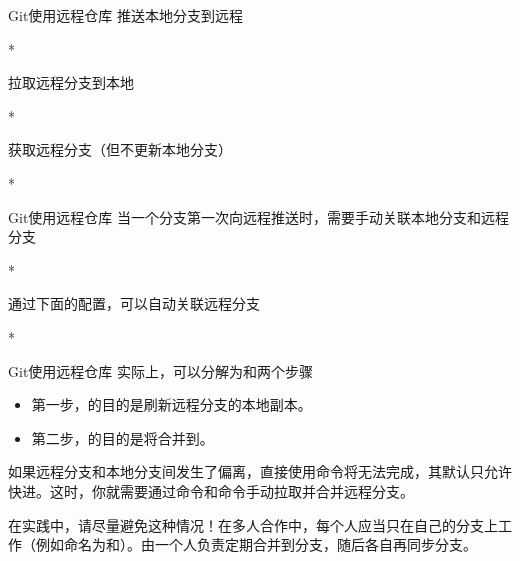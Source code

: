 \begin{frame}{Git使用远程仓库}
    推送本地分支到远程
    \begin{Code}*
        
    \end{Code}
    拉取远程分支到本地
    \begin{Code}*
        
    \end{Code}
    获取远程分支（但不更新本地分支）
    \begin{Code}*
        
    \end{Code}
\end{frame}

\begin{frame}{Git使用远程仓库}
    当一个分支第一次向远程推送时，需要手动关联本地分支和远程分支
    \begin{Code}*
        
    \end{Code}
    通过下面的配置，可以自动关联远程分支
    \begin{Code}*
        
    \end{Code}
\end{frame}

\begin{frame}{Git使用远程仓库}
    实际上，可以分解为和两个步骤
    \begin{itemize}
        \item 第一步，的目的是刷新远程分支的本地副本。
        \item 第二步，的目的是将合并到。
    \end{itemize}
    如果远程分支和本地分支间发生了偏离，直接使用命令将无法完成，其默认只允许快进。这时，你就需要通过命令和命令手动拉取并合并远程分支。
    
    在实践中，请尽量避免这种情况！在多人合作中，每个人应当只在自己的分支上工作（例如命名为和）。由一个人负责定期合并到分支，随后各自再同步分支。
\end{frame}

